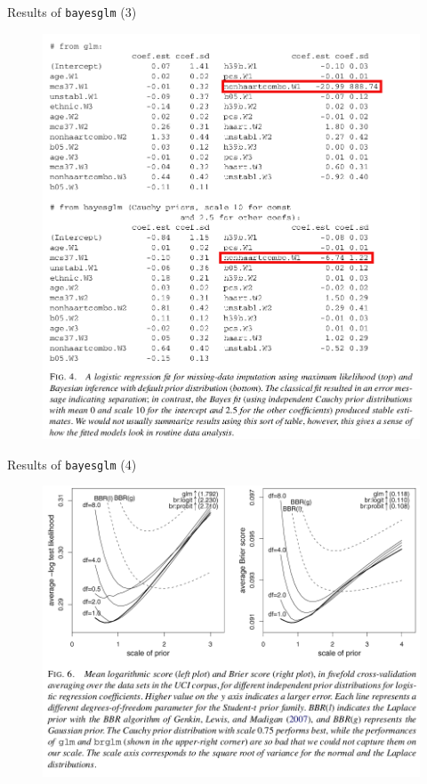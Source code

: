 \documentclass{beamer}
\begin{document}
\begin{frame}{Results of \texttt{bayesglm} (3)}
	\begin{figure}
		\includegraphics[scale=0.24]{imgs/result3.png}
	\end{figure}
\end{frame}

\begin{frame}{Results of \texttt{bayesglm} (4)}
	\begin{figure}
		\includegraphics[scale=0.24]{imgs/result4.png}
	\end{figure}
\end{frame}
\end{document}
